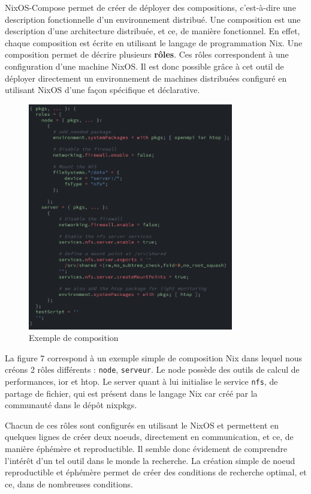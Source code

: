\documentclass[a4paper,french,12pt, titlepage]{article}
\begin{document}
NixOS-Compose permet de créer de déployer des compositions, c'est-à-dire
une description fonctionnelle d'un environnement distribué. Une
composition est une description d'une architecture distribuée, et ce, de
manière fonctionnel. En effet, chaque composition est écrite en
utilisant le langage de programmation Nix. Une composition permet de
décrire plusieurs \textbf{rôles}. Ces rôles correspondent à une
configuration d'une machine NixOS. Il est donc possible grâce à cet
outil de déployer directement un environnement de machines distribuées
configuré en utilisant NixOS d'une façon spécifique et
déclarative.\newline

\begin{figure}[h]
\centering
\includegraphics[width=0.8\textwidth,height=0.8\textheight,keepaspectratio]{images/coposition-nfs.png}
\caption{Exemple de composition}
\end{figure}

La figure 7 correspond à un exemple simple de composition Nix dans
lequel nous créons 2 rôles différents : \texttt{node}, \texttt{serveur}.
Le node possède des outils de calcul de performances, ior et htop. Le
server quant à lui initialise le service \texttt{nfs}, de partage de
fichier, qui est présent dans le langage Nix car créé par la communauté
dans le dépôt nixpkgs.\newline

Chacun de ces rôles sont configurés en utilisant le NixOS et permettent
en quelques lignes de créer deux noeuds, directement en communication,
et ce, de manière éphémère et reproductible. Il semble donc évidement de
comprendre l'intérêt d'un tel outil dans le monde la recherche. La
création simple de noeud reproductible et éphémère permet de créer des
conditions de recherche optimal, et ce, dans de nombreuses
conditions.\newline
\end{document}
